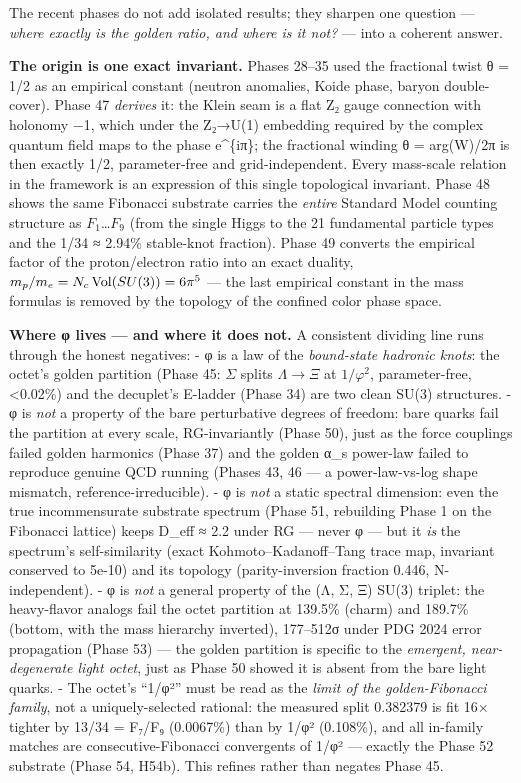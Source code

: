 \documentclass[
]{article}
\begin{document}
The recent phases do not add isolated results; they sharpen one question
--- \emph{where exactly is the golden ratio, and where is it not?} ---
into a coherent answer.

\textbf{The origin is one exact invariant.} Phases 28--35 used the
fractional twist θ = 1/2 as an empirical constant (neutron anomalies,
Koide phase, baryon double-cover). Phase 47 \emph{derives} it: the Klein
seam is a flat Z₂ gauge connection with holonomy −1, which under the
Z₂→U(1) embedding required by the complex quantum field maps to the
phase e\^{}\{iπ\}; the fractional winding θ = arg(W)/2π is then exactly
1/2, parameter-free and grid-independent. Every mass-scale relation in
the framework is an expression of this single topological invariant.
Phase 48 shows the same Fibonacci substrate carries the \emph{entire}
Standard Model counting structure as \(F_1\)\ldots{}\(F_9\) (from the
single Higgs to the 21 fundamental particle types and the 1/34 ≈ 2.94\%
stable-knot fraction). Phase 49 converts the empirical factor of the
proton/electron ratio into an exact duality,
\(m_p/m_e = N_c\,{\rm Vol}(SU(3)) = 6\pi^5\) --- the last empirical
constant in the mass formulas is removed by the topology of the confined
color phase space.

\textbf{Where φ lives --- and where it does not.} A consistent dividing
line runs through the honest negatives: - φ is a law of the
\emph{bound-state hadronic knots}: the octet's golden partition (Phase
45: \(\Sigma\) splits \(\Lambda\to\Xi\) at \(1/\varphi^2\),
parameter-free, \textless0.02\%) and the decuplet's E-ladder (Phase 34)
are two clean SU(3) structures. - φ is \emph{not} a property of the bare
perturbative degrees of freedom: bare quarks fail the partition at every
scale, RG-invariantly (Phase 50), just as the force couplings failed
golden harmonics (Phase 37) and the golden α\_s power-law failed to
reproduce genuine QCD running (Phases 43, 46 --- a power-law-vs-log
shape mismatch, reference-irreducible). - φ is \emph{not} a static
spectral dimension: even the true incommensurate substrate spectrum
(Phase 51, rebuilding Phase 1 on the Fibonacci lattice) keeps D\_eff ≈
2.2 under RG --- never φ --- but it \emph{is} the spectrum's
self-similarity (exact Kohmoto--Kadanoff--Tang trace map, invariant
conserved to 5e-10) and its topology (parity-inversion fraction 0.446,
N-independent). - φ is \emph{not} a general property of the (Λ, Σ, Ξ)
SU(3) triplet: the heavy-flavor analogs fail the octet partition at
139.5\% (charm) and 189.7\% (bottom, with the mass hierarchy inverted),
177--512σ under PDG 2024 error propagation (Phase 53) --- the golden
partition is specific to the \emph{emergent, near-degenerate light
octet}, just as Phase 50 showed it is absent from the bare light quarks.
- The octet's ``1/φ²'' must be read as the \emph{limit of the
golden-Fibonacci family}, not a uniquely-selected rational: the measured
split 0.382379 is fit 16× tighter by 13/34 = F₇/F₉ (0.0067\%) than by
1/φ² (0.108\%), and all in-family matches are consecutive-Fibonacci
convergents of 1/φ² --- exactly the Phase 52 substrate (Phase 54, H54b).
This refines rather than negates Phase 45.
\end{document}
